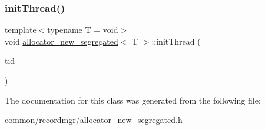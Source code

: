 \mbox{\label{classallocator__new__segregated_a143dbe613cd2e5b903c2fefcc02238f2}} 
\subsubsection{\texorpdfstring{init\+Thread()}{initThread()}}
{\footnotesize\ttfamily template$<$typename T  = void$>$ \\
void \hyperlink{classallocator__new__segregated}{allocator\+\_\+new\+\_\+segregated}$<$ T $>$\+::init\+Thread (\begin{DoxyParamCaption}\item[{const int}]{tid }\end{DoxyParamCaption})\hspace{0.3cm}{\ttfamily [inline]}}



The documentation for this class was generated from the following file\+:\begin{DoxyCompactItemize}
\item 
common/recordmgr/\hyperlink{allocator__new__segregated_8h}{allocator\+\_\+new\+\_\+segregated.\+h}\end{DoxyCompactItemize}
